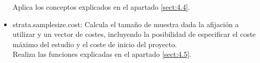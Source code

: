 \begin{itemize}[label=$\bullet$]
    Aplica los conceptos explicados en el apartado \ref{sect:4.4}.

    \item strata.samplesize.cost: Calcula el tamaño de muestra dada la afijación a utilizar y un vector de costes, incluyendo la posibilidad de especificar el coste máximo del estudio y el coste de inicio del proyecto.\\

    Realiza las funciones explicadas en el apartado \ref{sect:4.5}.


\end{itemize}
